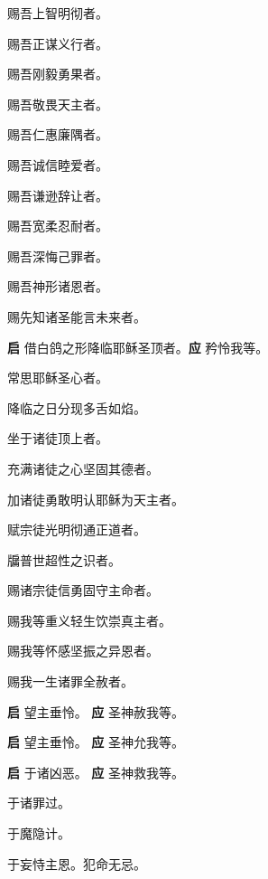 \documentclass[UTF8,17pt]{ctexart}
\begin{document}
 赐吾上智明彻者。

 赐吾正谋义⾏者。

 赐吾刚毅勇果者。

 赐吾敬畏天主者。

 赐吾仁惠廉隅者。

 赐吾诚信睦爱者。

 赐吾谦逊辞让者。

 赐吾宽柔忍耐者。

 赐吾深悔⼰罪者。

 赐吾神形诸恩者。

 赐先知诸圣能⾔未来者。

\textbf{启} \quad 借⽩鸽之形降临耶稣圣顶者。\hfill \textbf{应} \quad 矜怜我等。

 常思耶稣圣⼼者。

 降临之⽇分现多⾆如焰。

 坐于诸徒顶上者。

 充满诸徒之⼼坚固其德者。

 加诸徒勇敢明认耶稣为天主者。

 赋宗徒光明彻通正道者。

 牖普世超性之识者。

 赐诸宗徒信勇固守主命者。

 赐我等重义轻⽣饮崇真主者。

 赐我等怀感坚振之异恩者。

 赐我⼀⽣诸罪全赦者。

\textbf{启} \quad 望主垂怜。 \hfill \textbf{应} \quad 圣神赦我等。

\textbf{启} \quad 望主垂怜。 \hfill \textbf{应} \quad 圣神允我等。

\textbf{启} \quad 于诸凶恶。 \hfill \textbf{应} \quad 圣神救我等。

 于诸罪过。

 于魔隐计。

 于妄恃主恩。犯命⽆忌。
\end{document}
